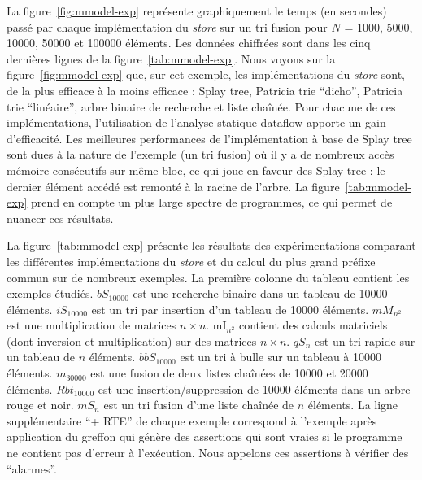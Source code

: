 La figure~\ref{fig:mmodel-exp} représente graphiquement le temps (en secondes)
passé par chaque implémentation du {\em store} sur un tri fusion pour $N$ =
1000, 5000, 10000, 50000 et 100000 éléments.
Les données chiffrées sont dans les cinq dernières lignes de la
figure~\ref{tab:mmodel-exp}.
Nous voyons sur la figure~\ref{fig:mmodel-exp} que, sur cet exemple, les
implémentations du {\em store} sont, de la plus efficace à la moins efficace :
Splay tree, Patricia trie ``dicho'', Patricia trie ``linéaire'', arbre binaire
de recherche et liste chaînée.
Pour chacune de ces implémentations, l'utilisation de l'analyse statique
dataflow apporte un gain d'efficacité.
Les meilleures performances de l'implémentation à base de Splay tree sont dues à
la nature de l'exemple (un tri fusion) où il y a de nombreux accès mémoire
consécutifs sur même bloc, ce qui joue en faveur des Splay tree : le dernier
élément accédé est remonté à la racine de l'arbre.
La figure~\ref{tab:mmodel-exp} prend en compte un plus large spectre de
programmes, ce qui permet de nuancer ces résultats.

La figure~\ref{tab:mmodel-exp} présente les résultats des expérimentations
comparant les différentes implémentations du {\em store} et du calcul du plus
grand préfixe commun sur de nombreux exemples.
La première colonne du tableau contient les exemples étudiés.
$bS_{10000}$ est une recherche binaire dans un tableau de 10000 éléments.
$iS_{10000}$ est un tri par insertion d'un tableau de 10000 éléments.
$mM_{n^2}$ est une multiplication de matrices $n \times n$. mI$_{n^2}$ contient
des calculs matriciels (dont inversion et multiplication) sur des  matrices
$n \times n$.
$qS_n$ est un tri rapide sur un tableau de $n$ éléments.
$bbS_{10000}$ est un tri à bulle sur un tableau à 10000 éléments.
$m_{30000}$ est une fusion de deux listes chaînées de 10000 et 20000 éléments.
$Rbt_{10000}$ est une insertion/suppression de 10000 éléments dans un arbre rouge
et noir.
$mS_n$ est un tri fusion d'une liste chaînée de $n$ éléments.
La ligne supplémentaire ``+ RTE'' de chaque exemple correspond à l'exemple après
application du greffon \rte qui génère des assertions qui sont vraies si le
programme ne contient pas d'erreur à l'exécution.
Nous appelons ces assertions à vérifier des ``alarmes''.

